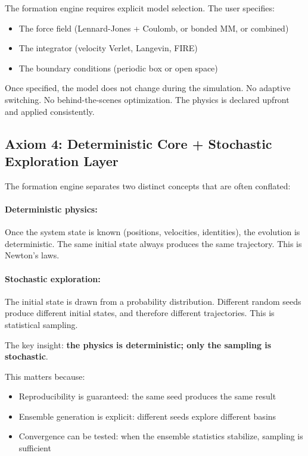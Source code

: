 \documentclass[11pt]{article}
\begin{document}
The formation engine requires explicit model selection. The user specifies:
\begin{itemize}
\item The force field (Lennard-Jones + Coulomb, or bonded MM, or combined)
\item The integrator (velocity Verlet, Langevin, FIRE)
\item The boundary conditions (periodic box or open space)
\end{itemize}

Once specified, the model does not change during the simulation. No adaptive switching. No behind-the-scenes optimization. The physics is declared upfront and applied consistently.

\subsection{Axiom 4: Deterministic Core + Stochastic Exploration Layer}

The formation engine separates two distinct concepts that are often conflated:

\paragraph{Deterministic physics:} Once the system state is known (positions, velocities, identities), the evolution is deterministic. The same initial state always produces the same trajectory. This is Newton's laws.

\paragraph{Stochastic exploration:} The initial state is drawn from a probability distribution. Different random seeds produce different initial states, and therefore different trajectories. This is statistical sampling.

The key insight: \textbf{the physics is deterministic; only the sampling is stochastic}.

This matters because:
\begin{itemize}
\item Reproducibility is guaranteed: the same seed produces the same result
\item Ensemble generation is explicit: different seeds explore different basins
\item Convergence can be tested: when the ensemble statistics stabilize, sampling is sufficient
\end{itemize}
\end{document}
